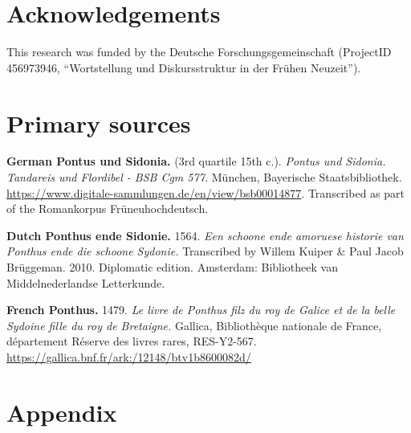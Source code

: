 \documentclass[output=paper,colorlinks,citecolor=brown]{langscibook}
\begin{document}
\section*{Acknowledgements}
This research was funded by the Deutsche Forschungsgemeinschaft (ProjectID 456973946, ``Wortstellung und Diskursstruktur in der Frühen Neuzeit'').

\section*{Primary sources}
\begin{hangparas}{.25in}{1}
\textbf{German Pontus und Sidonia.} (3rd quartile 15th c.). \textit{Pontus und Sidonia. Tandareis und Flordibel - BSB Cgm 577.} München, Bayerische Staatsbibliothek. \url{https://www.digitale-sammlungen.de/en/view/bsb00014877}. Transcribed as part of the Romankorpus Früneuhochdeutsch.

\textbf{Dutch Ponthus ende Sidonie.} 1564. \textit{Een schoone ende amoruese historie van Ponthus ende die schoone Sydonie.} Transcribed by Willem Kuiper \& Paul Jacob Brüggeman. 2010. Diplomatic edition. Amsterdam: Bibliotheek van Middelnederlandse Letterkunde.


\textbf{French Ponthus.} 1479. \textit{Le livre de Ponthus filz du roy de Galice et de la belle Sydoine fille du roy de Bretaigne.} Gallica, Bibliothèque nationale de France, département Réserve des livres rares, RES-Y2-567. \url{https://gallica.bnf.fr/ark:/12148/btv1b8600082d/}

\end{hangparas}

\bigskip

 {\sloppy\printbibliography[heading=subbibliography,notkeyword=this]}

\newpage
\section*{Appendix}\label{bloom:app}
\end{document}
